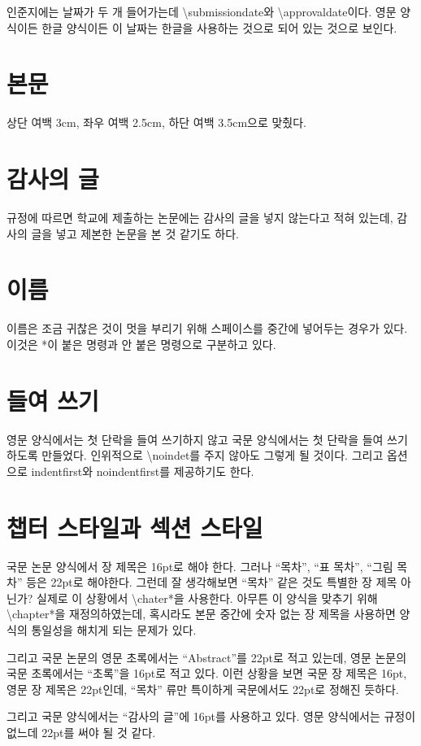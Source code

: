 \documentclass[a4paper]{report}
\begin{document}
인준지에는 날짜가 두 개 들어가는데 
\textbackslash submissiondate와 \textbackslash approvaldate이다.
영문 양식이든 한글 양식이든 이 날짜는 한글을 사용하는 것으로
되어 있는 것으로 보인다.

\section{본문}
상단 여백 3cm, 좌우 여백 2.5cm, 하단 여백 3.5cm으로 맞췄다.

\section{감사의 글}
규정에 따르면 학교에 제출하는 논문에는 감사의 글을 넣지 않는다고
적혀 있는데, 감사의 글을 넣고 제본한 논문을 본 것 같기도 하다.

\section{이름}
이름은 조금 귀찮은 것이 멋을 부리기 위해 스페이스를
중간에 넣어두는 경우가 있다. 이것은 *이 붙은 명령과
안 붙은 명령으로 구분하고 있다.

\section{들여 쓰기}
영문 양식에서는 첫 단락을 들여 쓰기하지 않고
국문 양식에서는 첫 단락을 들여 쓰기하도록
만들었다.
인위적으로 \textbackslash noindet를 주지 않아도
그렇게 될 것이다.
그리고 옵션으로 indentfirst와 noindentfirst를 제공하기도 한다.

\section{챕터 스타일과 섹션 스타일}
국문 논문 양식에서 장 제목은 16pt로 해야 한다.
그러나 ``목차'', ``표 목차'', ``그림 목차'' 등은
22pt로 해야한다. 그런데 잘 생각해보면 ``목차''
같은 것도 특별한 장 제목 아닌가?
실제로  이 상황에서 \textbackslash chater*을
사용한다. 아무튼 
이 양식을 맞추기 위해 \textbackslash chapter*을
재정의하였는데, 혹시라도 본문 중간에 숫자 없는 장
제목을 사용하면 양식의 통일성을 해치게 되는 문제가 있다.

그리고 국문 논문의 영문 초록에서는 ``Abstract''를 22pt로
적고 있는데, 영문 논문의 국문 초록에서는 ``초록''을
16pt로 적고 있다. 이런 상황을 보면 국문 장 제목은
16pt, 영문 장 제목은 22pt인데, ``목차'' 류만 특이하게
국문에서도 22pt로 정해진 듯하다.

그리고 국문 양식에서는 ``감사의 글''에 16pt를 사용하고 있다.
영문 양식에서는 규정이 없느데 22pt를 써야 될 것 같다.
\end{document}

